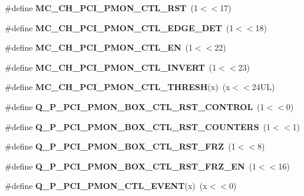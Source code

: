 \begin{DoxyCompactItemize}
\item 
\#define {\bfseries M\+C\+\_\+\+C\+H\+\_\+\+P\+C\+I\+\_\+\+P\+M\+O\+N\+\_\+\+C\+T\+L\+\_\+\+R\+S\+T}~(1$<$$<$17)\label{types_8h_a1151645ee0197931e91ea8f8761f14ba}

\item 
\#define {\bfseries M\+C\+\_\+\+C\+H\+\_\+\+P\+C\+I\+\_\+\+P\+M\+O\+N\+\_\+\+C\+T\+L\+\_\+\+E\+D\+G\+E\+\_\+\+D\+E\+T}~(1$<$$<$18)\label{types_8h_a85da56ce7f41dd054fbc56d29ed163e8}

\item 
\#define {\bfseries M\+C\+\_\+\+C\+H\+\_\+\+P\+C\+I\+\_\+\+P\+M\+O\+N\+\_\+\+C\+T\+L\+\_\+\+E\+N}~(1$<$$<$22)\label{types_8h_afcd945a25e7fd6fdd56db22f85f3dd45}

\item 
\#define {\bfseries M\+C\+\_\+\+C\+H\+\_\+\+P\+C\+I\+\_\+\+P\+M\+O\+N\+\_\+\+C\+T\+L\+\_\+\+I\+N\+V\+E\+R\+T}~(1$<$$<$23)\label{types_8h_a1e236122a4282b5013bb6a13762ddc19}

\item 
\#define {\bfseries M\+C\+\_\+\+C\+H\+\_\+\+P\+C\+I\+\_\+\+P\+M\+O\+N\+\_\+\+C\+T\+L\+\_\+\+T\+H\+R\+E\+S\+H}(x)~(x$<$$<$24\+U\+L)\label{types_8h_a4703fc1a4abb93c3da21b88a6c1bdffa}

\item 
\#define {\bfseries Q\+\_\+\+P\+\_\+\+P\+C\+I\+\_\+\+P\+M\+O\+N\+\_\+\+B\+O\+X\+\_\+\+C\+T\+L\+\_\+\+R\+S\+T\+\_\+\+C\+O\+N\+T\+R\+O\+L}~(1$<$$<$0)\label{types_8h_aec103c54b1ec85bc8a8f517432f6695f}

\item 
\#define {\bfseries Q\+\_\+\+P\+\_\+\+P\+C\+I\+\_\+\+P\+M\+O\+N\+\_\+\+B\+O\+X\+\_\+\+C\+T\+L\+\_\+\+R\+S\+T\+\_\+\+C\+O\+U\+N\+T\+E\+R\+S}~(1$<$$<$1)\label{types_8h_afa4a9494135a4a4743aeda0be9692a18}

\item 
\#define {\bfseries Q\+\_\+\+P\+\_\+\+P\+C\+I\+\_\+\+P\+M\+O\+N\+\_\+\+B\+O\+X\+\_\+\+C\+T\+L\+\_\+\+R\+S\+T\+\_\+\+F\+R\+Z}~(1$<$$<$8)\label{types_8h_ad2ff6676277fb195a75028cdf248a9d5}

\item 
\#define {\bfseries Q\+\_\+\+P\+\_\+\+P\+C\+I\+\_\+\+P\+M\+O\+N\+\_\+\+B\+O\+X\+\_\+\+C\+T\+L\+\_\+\+R\+S\+T\+\_\+\+F\+R\+Z\+\_\+\+E\+N}~(1$<$$<$16)\label{types_8h_a5cab64dd7d211e1721a9bdc68db81106}

\item 
\#define {\bfseries Q\+\_\+\+P\+\_\+\+P\+C\+I\+\_\+\+P\+M\+O\+N\+\_\+\+C\+T\+L\+\_\+\+E\+V\+E\+N\+T}(x)~(x$<$$<$0)\label{types_8h_ab7f3a6b3342d5c302104b7842987b5b8}


\end{DoxyCompactItemize}
